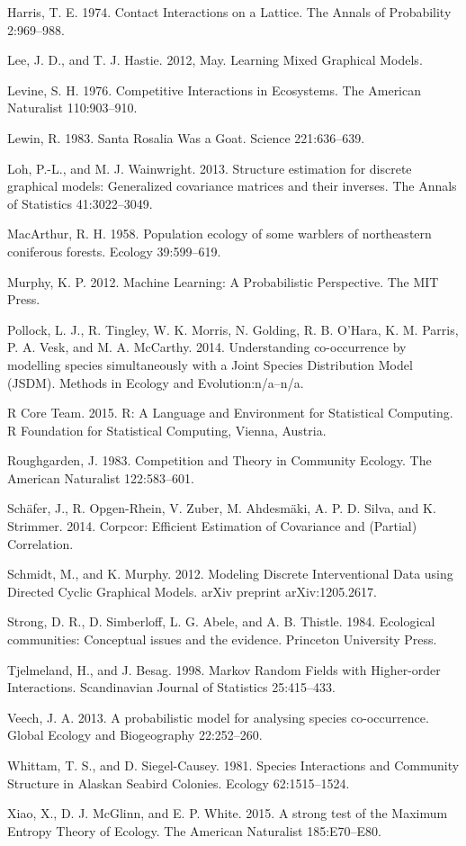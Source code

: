 \documentclass[12pt,]{article}
\begin{document}
\begin{spacing}{1.9}
\begin{flushleft}
Harris, T. E. 1974. Contact Interactions on a Lattice. The Annals of
Probability 2:969--988.

Lee, J. D., and T. J. Hastie. 2012, May. Learning Mixed Graphical
Models.

Levine, S. H. 1976. Competitive Interactions in Ecosystems. The American
Naturalist 110:903--910.

Lewin, R. 1983. Santa Rosalia Was a Goat. Science 221:636--639.

Loh, P.-L., and M. J. Wainwright. 2013. Structure estimation for
discrete graphical models: Generalized covariance matrices and their
inverses. The Annals of Statistics 41:3022--3049.

MacArthur, R. H. 1958. Population ecology of some warblers of
northeastern coniferous forests. Ecology 39:599--619.

Murphy, K. P. 2012. Machine Learning: A Probabilistic Perspective. The
MIT Press.

Pollock, L. J., R. Tingley, W. K. Morris, N. Golding, R. B. O'Hara, K.
M. Parris, P. A. Vesk, and M. A. McCarthy. 2014. Understanding
co-occurrence by modelling species simultaneously with a Joint Species
Distribution Model (JSDM). Methods in Ecology and Evolution:n/a--n/a.

R Core Team. 2015. R: A Language and Environment for Statistical
Computing. R Foundation for Statistical Computing, Vienna, Austria.

Roughgarden, J. 1983. Competition and Theory in Community Ecology. The
American Naturalist 122:583--601.

Schäfer, J., R. Opgen-Rhein, V. Zuber, M. Ahdesmäki, A. P. D. Silva, and
K. Strimmer. 2014. Corpcor: Efficient Estimation of Covariance and
(Partial) Correlation.

Schmidt, M., and K. Murphy. 2012. Modeling Discrete Interventional Data
using Directed Cyclic Graphical Models. arXiv preprint arXiv:1205.2617.

Strong, D. R., D. Simberloff, L. G. Abele, and A. B. Thistle. 1984.
Ecological communities: Conceptual issues and the evidence. Princeton
University Press.

Tjelmeland, H., and J. Besag. 1998. Markov Random Fields with
Higher-order Interactions. Scandinavian Journal of Statistics
25:415--433.

Veech, J. A. 2013. A probabilistic model for analysing species
co-occurrence. Global Ecology and Biogeography 22:252--260.

Whittam, T. S., and D. Siegel-Causey. 1981. Species Interactions and
Community Structure in Alaskan Seabird Colonies. Ecology 62:1515--1524.

Xiao, X., D. J. McGlinn, and E. P. White. 2015. A strong test of the
Maximum Entropy Theory of Ecology. The American Naturalist 185:E70--E80.
\end{flushleft}
\end{spacing}
\end{document}

